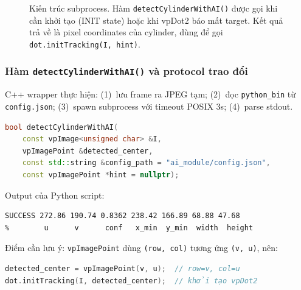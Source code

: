 \begin{figure}[htbp]
  \caption{Kiến trúc subprocess. Hàm \texttt{detectCylinderWithAI()} được
           gọi khi cần khởi tạo (INIT state) hoặc khi vpDot2 báo mất
           target. Kết quả trả về là pixel coordinates của cylinder,
           dùng để gọi \texttt{dot.initTracking(I,~hint)}.}
  \label{fig:ai3-arch}
\end{figure}

\subsubsection*{Hàm \texttt{detectCylinderWithAI()} và protocol trao đổi}

C++ wrapper thực hiện: (1)~lưu frame ra JPEG tạm; (2)~đọc
\texttt{python\_bin} từ \texttt{config.json}; (3)~spawn subprocess với
timeout POSIX 3s; (4)~parse stdout.

\begin{lstlisting}[language=C++]
bool detectCylinderWithAI(
    const vpImage<unsigned char> &I,
    vpImagePoint &detected_center,
    const std::string &config_path = "ai_module/config.json",
    const vpImagePoint *hint = nullptr);
\end{lstlisting}

Output của Python script:
\begin{lstlisting}[language={}]
SUCCESS 272.86 190.74 0.8362 238.42 166.89 68.88 47.68
%        u      v      conf   x_min  y_min  width  height
\end{lstlisting}

Điểm cần lưu ý: \texttt{vpImagePoint} dùng
\texttt{(row,\,col)} tương ứng \texttt{(v,\,u)}, nên:
\begin{lstlisting}[language=C++]
detected_center = vpImagePoint(v, u);  // row=v, col=u
dot.initTracking(I, detected_center);  // khởi tạo vpDot2
\end{lstlisting}


